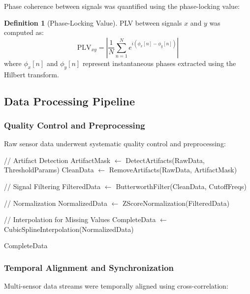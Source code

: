 \documentclass[12pt,a4paper]{article}
\theoremstyle{definition}
\newtheorem{definition}{Definition}[section]
\begin{document}
Phase coherence between signals was quantified using the phase-locking value:

\begin{definition}[Phase-Locking Value]
PLV between signals $x$ and $y$ was computed as:
\begin{equation}
\text{PLV}_{xy} = \left| \frac{1}{N} \sum_{n=1}^{N} e^{i(\phi_x[n] - \phi_y[n])} \right|
\end{equation}
where $\phi_x[n]$ and $\phi_y[n]$ represent instantaneous phases extracted using the Hilbert transform.
\end{definition}

\subsection{Data Processing Pipeline}

\subsubsection{Quality Control and Preprocessing}

Raw sensor data underwent systematic quality control and preprocessing:

\begin{algorithm}
\caption{Data Preprocessing Pipeline}
\begin{algorithmic}
    \State // Artifact Detection
    \State ArtifactMask $\leftarrow$ DetectArtifacts(RawData, ThresholdParams)
    \State CleanData $\leftarrow$ RemoveArtifacts(RawData, ArtifactMask)

    \State // Signal Filtering
    \State FilteredData $\leftarrow$ ButterworthFilter(CleanData, CutoffFreqs)

    \State // Normalization
    \State NormalizedData $\leftarrow$ ZScoreNormalization(FilteredData)

    \State // Interpolation for Missing Values
    \State CompleteData $\leftarrow$ CubicSplineInterpolation(NormalizedData)

    \State \Return CompleteData
\EndProcedure
\end{algorithmic}
\end{algorithm}

\subsubsection{Temporal Alignment and Synchronization}

Multi-sensor data streams were temporally aligned using cross-correlation:
\end{document}
